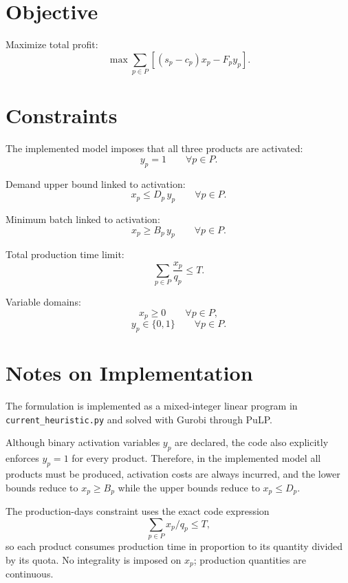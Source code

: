 \section*{Objective}

Maximize total profit:
\[
\max \sum_{p \in P} \left[(s_p-c_p)x_p - F_p y_p\right].
\]

\section*{Constraints}

The implemented model imposes that all three products are activated:
\[
y_p = 1 \qquad \forall p \in P.
\]

Demand upper bound linked to activation:
\[
x_p \le D_p\, y_p \qquad \forall p \in P.
\]

Minimum batch linked to activation:
\[
x_p \ge B_p\, y_p \qquad \forall p \in P.
\]

Total production time limit:
\[
\sum_{p \in P} \frac{x_p}{q_p} \le T.
\]

Variable domains:
\[
x_p \ge 0 \qquad \forall p \in P,
\]
\[
y_p \in \{0,1\} \qquad \forall p \in P.
\]

\section*{Notes on Implementation}

The formulation is implemented as a mixed-integer linear program in \texttt{current\_heuristic.py} and solved with Gurobi through PuLP.

Although binary activation variables \(y_p\) are declared, the code also explicitly enforces
\(
y_p=1
\)
for every product. Therefore, in the implemented model all products must be produced, activation costs are always incurred, and the lower bounds reduce to
\(
x_p \ge B_p
\)
while the upper bounds reduce to
\(
x_p \le D_p
\).

The production-days constraint uses the exact code expression
\[
\sum_{p\in P} x_p/q_p \le T,
\]
so each product consumes production time in proportion to its quantity divided by its quota. No integrality is imposed on \(x_p\); production quantities are continuous.
